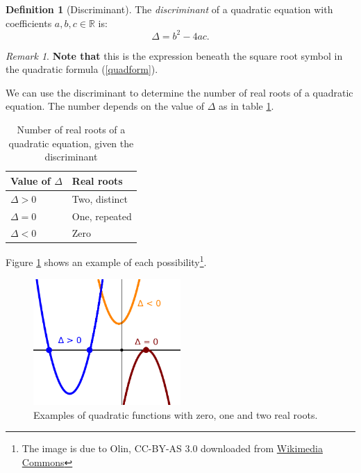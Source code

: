 \documentclass[12pt,a4paper]{article}
\theoremstyle{definition}
\newtheorem{definition}[proposition]{Definition}
\theoremstyle{remark}
\newtheorem{remark}[proposition]{Remark}
\begin{document}
\begin{definition}[Discriminant]
The \emph{discriminant} of a quadratic equation with coefficients \(a, b, c \in \mathbb{R}\) is:
\[
\Delta = b^2 - 4ac.
\]
\end{definition}

\begin{remark}
{\bf Note that} this is the expression beneath the square root symbol in the quadratic formula (\cref{quadform}).
\end{remark}

We can use the discriminant to determine the number of real roots of a quadratic equation. The number depends on the value of \(\Delta\) as in table \cref{Distable}.
\begin{table}[!h]
\begin{center}
\begin{tabular}{|l|l|}
\hline
Value of \(\Delta\) & Real roots \\
\hline
\(\Delta > 0\) & Two, distinct\\
\(\Delta = 0\) & One, repeated\\
\(\Delta < 0\) & Zero\\
\hline
\end{tabular}
\end{center}
\caption{Number of real roots of a quadratic equation, given the discriminant}
\label{Distable}
\end{table}

Figure \cref{DisFig} shows an example of each possibility\footnote{The image is due to Olin, CC-BY-AS 3.0 downloaded from \href{https://commons.wikimedia.org/wiki/File:Quadratic_eq_discriminant.svg}{Wikimedia Commons}}.
\begin{figure}[!h]
\begin{center}
\includegraphics[width=0.5\textwidth]{Quadratic_eq_discriminant.pdf}
\end{center}
\caption{Examples of quadratic functions with zero, one and two real roots.}
\label{DisFig}
\end{figure}
\end{document}
